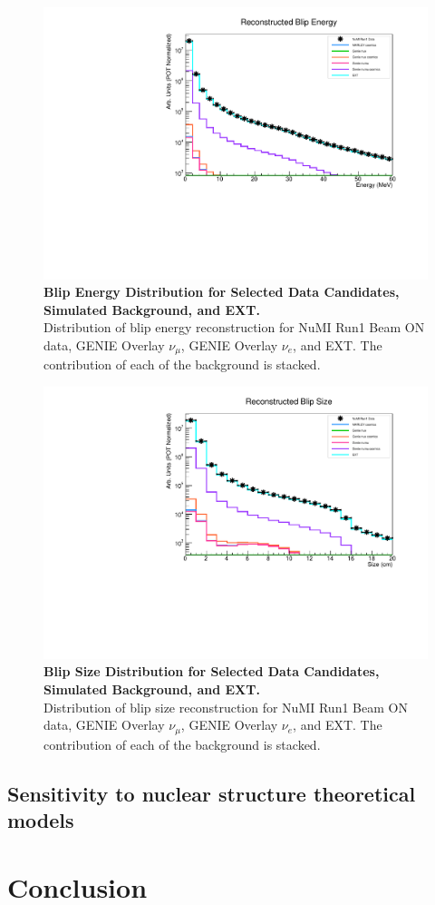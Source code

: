 \begin{figure}[h!]
    \centering
    \includegraphics[width=120mm]{Figures/energy.pdf}
    \caption[Blip Energy Distribution for Selected Data Candidates, Simulated Background, and EXT.]{{\textbf{Blip Energy Distribution for Selected Data Candidates, Simulated Background, and EXT.}}\\ Distribution of blip energy reconstruction for NuMI Run1 Beam ON data, GENIE Overlay $\nu_{\mu}$, GENIE Overlay $\nu_{e}$, and EXT. The contribution of each of the background is stacked.}
    \label{blip_nplanes_data}
\end{figure}

\begin{figure}[h!]
    \centering
    \includegraphics[width=120mm]{Figures/size.pdf}
    \caption[Blip Size Distribution for Selected Data Candidates, Simulated Background, and EXT.]{{\textbf{Blip Size Distribution for Selected Data Candidates, Simulated Background, and EXT.}}\\ Distribution of blip size reconstruction for NuMI Run1 Beam ON data, GENIE Overlay $\nu_{\mu}$, GENIE Overlay $\nu_{e}$, and EXT. The contribution of each of the background is stacked.}
    \label{blip_size_data}
\end{figure}

\subsection{Sensitivity to nuclear structure theoretical models}

\section{Conclusion}
